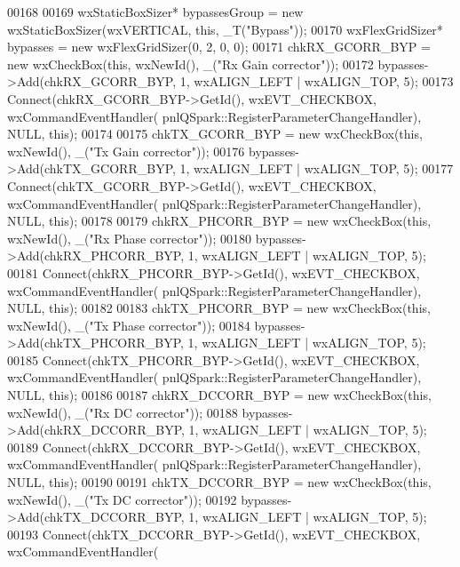 \begin{DoxyCode}
00168 
00169     wxStaticBoxSizer* bypassesGroup = \textcolor{keyword}{new} wxStaticBoxSizer(wxVERTICAL, \textcolor{keyword}{this}, \_T(\textcolor{stringliteral}{"Bypass"}));
00170     wxFlexGridSizer* bypasses = \textcolor{keyword}{new} wxFlexGridSizer(0, 2, 0, 0);
00171     chkRX_GCORR_BYP = \textcolor{keyword}{new} wxCheckBox(\textcolor{keyword}{this}, wxNewId(), \_(\textcolor{stringliteral}{"Rx Gain corrector"}));
00172     bypasses->Add(chkRX_GCORR_BYP, 1, wxALIGN\_LEFT | wxALIGN\_TOP, 5);
00173     Connect(chkRX_GCORR_BYP->GetId(), wxEVT\_CHECKBOX, wxCommandEventHandler(
      pnlQSpark::RegisterParameterChangeHandler), NULL, \textcolor{keyword}{this});
00174 
00175     chkTX_GCORR_BYP = \textcolor{keyword}{new} wxCheckBox(\textcolor{keyword}{this}, wxNewId(), \_(\textcolor{stringliteral}{"Tx Gain corrector"}));
00176     bypasses->Add(chkTX\_GCORR\_BYP, 1, wxALIGN\_LEFT | wxALIGN\_TOP, 5);
00177     Connect(chkTX\_GCORR\_BYP->GetId(), wxEVT\_CHECKBOX, wxCommandEventHandler(
      pnlQSpark::RegisterParameterChangeHandler), NULL, \textcolor{keyword}{this});
00178 
00179     chkRX_PHCORR_BYP = \textcolor{keyword}{new} wxCheckBox(\textcolor{keyword}{this}, wxNewId(), \_(\textcolor{stringliteral}{"Rx Phase corrector"}));
00180     bypasses->Add(chkRX\_PHCORR\_BYP, 1, wxALIGN\_LEFT | wxALIGN\_TOP, 5);
00181     Connect(chkRX\_PHCORR\_BYP->GetId(), wxEVT\_CHECKBOX, wxCommandEventHandler(
      pnlQSpark::RegisterParameterChangeHandler), NULL, \textcolor{keyword}{this});
00182 
00183     chkTX_PHCORR_BYP = \textcolor{keyword}{new} wxCheckBox(\textcolor{keyword}{this}, wxNewId(), \_(\textcolor{stringliteral}{"Tx Phase corrector"}));
00184     bypasses->Add(chkTX\_PHCORR\_BYP, 1, wxALIGN\_LEFT | wxALIGN\_TOP, 5);
00185     Connect(chkTX\_PHCORR\_BYP->GetId(), wxEVT\_CHECKBOX, wxCommandEventHandler(
      pnlQSpark::RegisterParameterChangeHandler), NULL, \textcolor{keyword}{this});
00186 
00187     chkRX_DCCORR_BYP = \textcolor{keyword}{new} wxCheckBox(\textcolor{keyword}{this}, wxNewId(), \_(\textcolor{stringliteral}{"Rx DC corrector"}));
00188     bypasses->Add(chkRX\_DCCORR\_BYP, 1, wxALIGN\_LEFT | wxALIGN\_TOP, 5);
00189     Connect(chkRX\_DCCORR\_BYP->GetId(), wxEVT\_CHECKBOX, wxCommandEventHandler(
      pnlQSpark::RegisterParameterChangeHandler), NULL, \textcolor{keyword}{this});
00190 
00191     chkTX_DCCORR_BYP = \textcolor{keyword}{new} wxCheckBox(\textcolor{keyword}{this}, wxNewId(), \_(\textcolor{stringliteral}{"Tx DC corrector"}));
00192     bypasses->Add(chkTX\_DCCORR\_BYP, 1, wxALIGN\_LEFT | wxALIGN\_TOP, 5);
00193     Connect(chkTX\_DCCORR\_BYP->GetId(), wxEVT\_CHECKBOX, wxCommandEventHandler(

\end{DoxyCode}

